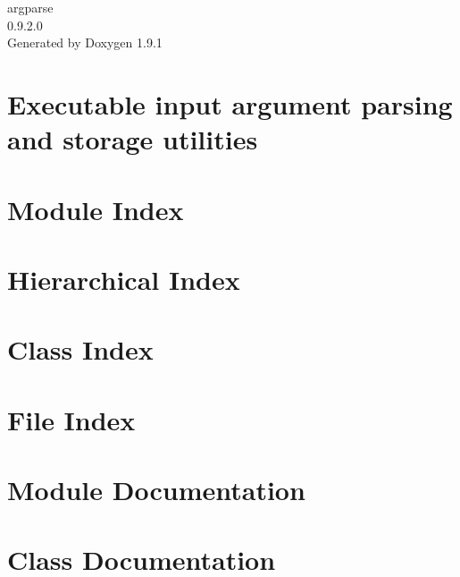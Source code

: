 \let\mypdfximage\pdfximage\def\pdfximage{\immediate\mypdfximage}\documentclass[twoside]{book}
\newcommand{\+}{\discretionary{\mbox{\scriptsize$\hookleftarrow$}}{}{}}
\newcommand{\clearemptydoublepage}{%
  \newpage{\pagestyle{empty}\cleardoublepage}%
}
\begin{document}
\raggedbottom

\hypersetup{pageanchor=false,
             bookmarksnumbered=true,
             pdfencoding=unicode
            }
\begin{titlepage}
\vspace*{7cm}
\begin{center}%
{\Large argparse \\[1ex]\large 0.\+9.\+2.\+0 }\\
\vspace*{1cm}
{\large Generated by Doxygen 1.9.1}\\
\end{center}
\end{titlepage}
\clearemptydoublepage
{}
\tableofcontents
\clearemptydoublepage
{}
\hypersetup{pageanchor=true}

\chapter{Executable input argument parsing and storage utilities}
\label{index}\hypertarget{index}{}
\chapter{Module Index}

\chapter{Hierarchical Index}

\chapter{Class Index}

\chapter{File Index}

\chapter{Module Documentation}




\chapter{Class Documentation}











\end{document}
